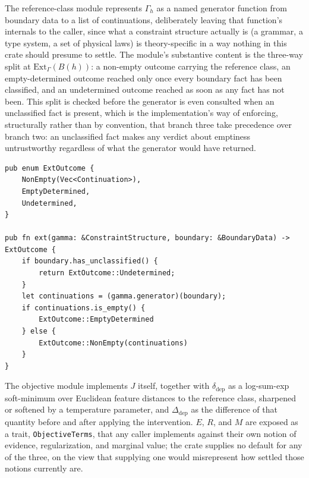 \documentclass[11pt]{article}
\begin{document}
The reference-class module represents $\Gamma_h$ as a named generator function from boundary data to a list of continuations, deliberately leaving that function's internals to the caller, since what a constraint structure actually is (a grammar, a type system, a set of physical laws) is theory-specific in a way nothing in this crate should presume to settle. The module's substantive content is the three-way split at $\mathrm{Ext}_\Gamma(B(h))$: a non-empty outcome carrying the reference class, an empty-determined outcome reached only once every boundary fact has been classified, and an undetermined outcome reached as soon as any fact has not been. This split is checked before the generator is even consulted when an unclassified fact is present, which is the implementation's way of enforcing, structurally rather than by convention, that branch three take precedence over branch two: an unclassified fact makes any verdict about emptiness untrustworthy regardless of what the generator would have returned.

\begin{lstlisting}
pub enum ExtOutcome {
    NonEmpty(Vec<Continuation>),
    EmptyDetermined,
    Undetermined,
}

pub fn ext(gamma: &ConstraintStructure, boundary: &BoundaryData) -> ExtOutcome {
    if boundary.has_unclassified() {
        return ExtOutcome::Undetermined;
    }
    let continuations = (gamma.generator)(boundary);
    if continuations.is_empty() {
        ExtOutcome::EmptyDetermined
    } else {
        ExtOutcome::NonEmpty(continuations)
    }
}
\end{lstlisting}

The objective module implements $J$ itself, together with $\delta_{\text{dep}}$ as a log-sum-exp soft-minimum over Euclidean feature distances to the reference class, sharpened or softened by a temperature parameter, and $\Delta_{\text{dep}}$ as the difference of that quantity before and after applying the intervention. $E$, $R$, and $M$ are exposed as a trait, \texttt{ObjectiveTerms}, that any caller implements against their own notion of evidence, regularization, and marginal value; the crate supplies no default for any of the three, on the view that supplying one would misrepresent how settled those notions currently are.
\end{document}
